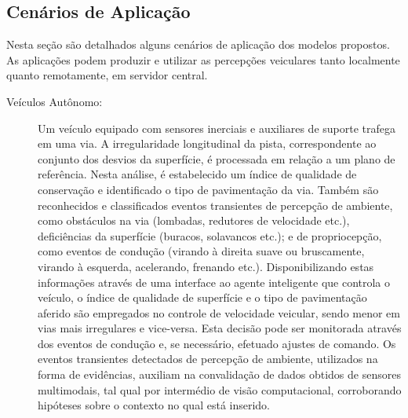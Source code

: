 \subsection{Cenários de Aplicação}

Nesta seção são detalhados alguns cenários de aplicação dos modelos propostos. As aplicações podem produzir e utilizar as percepções veiculares tanto localmente quanto remotamente, em servidor central.

\begin{description}

\item [Veículos Autônomo:] Um veículo equipado com sensores inerciais e auxiliares de suporte trafega em uma via. A irregularidade longitudinal da pista, correspondente ao conjunto dos desvios da superfície, é processada em relação a um plano de referência. Nesta análise, é estabelecido um índice de qualidade de conservação e identificado o tipo de pavimentação da via. Também são reconhecidos e classificados eventos transientes de percepção de ambiente, como obstáculos na via (lombadas, redutores de velocidade etc.), deficiências da superfície (buracos, solavancos etc.); e de propriocepção, como eventos de condução (virando à direita suave ou bruscamente, virando à esquerda, acelerando, frenando etc.). Disponibilizando estas informações através de uma interface ao agente inteligente que controla o veículo, o índice de qualidade de superfície e o tipo de pavimentação aferido são empregados no controle de velocidade veicular, sendo menor em vias mais irregulares e vice-versa. Esta decisão pode ser monitorada através dos eventos de condução e, se necessário, efetuado ajustes de comando. Os eventos transientes detectados de percepção de ambiente, utilizados na forma de evidências, auxiliam na convalidação de dados obtidos de sensores multimodais, tal qual por intermédio de visão computacional, corroborando hipóteses sobre o contexto no qual está inserido.


\end{description}
